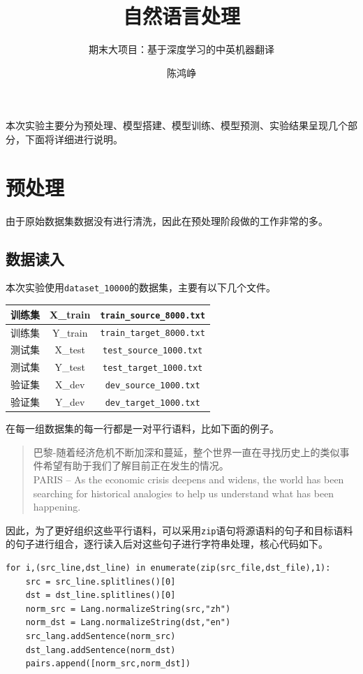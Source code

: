 \documentclass[logo,reportComp]{thesis}
\title{自然语言处理}
\subtitle{期末大项目：基于深度学习的中英机器翻译}
\author{陈鸿峥}
\begin{document}
\maketitle
\tableofcontents

\newpage

本次实验主要分为预处理、模型搭建、模型训练、模型预测、实验结果呈现几个部分，下面将详细进行说明。

\section{预处理}
由于原始数据集数据没有进行清洗，因此在预处理阶段做的工作非常的多。

\subsection{数据读入}
本次实验使用\verb'dataset_10000'的数据集，主要有以下几个文件。
\begin{table}[H]
\centering
\begin{tabular}{|c|c|c|}\hline
训练集 & X\_train & \verb'train_source_8000.txt'\\\hline
训练集 & Y\_train & \verb'train_target_8000.txt'\\\hline
测试集 & X\_test & \verb'test_source_1000.txt'\\\hline
测试集 & Y\_test & \verb'test_target_1000.txt'\\\hline
验证集 & X\_dev & \verb'dev_source_1000.txt'\\\hline
验证集 & Y\_dev & \verb'dev_target_1000.txt'\\\hline
\end{tabular}
\end{table}

在每一组数据集的每一行都是一对平行语料，比如下面的例子。
\begin{quote}
巴黎-随着经济危机不断加深和蔓延，整个世界一直在寻找历史上的类似事件希望有助于我们了解目前正在发生的情况。\\
PARIS -- As the economic crisis deepens and widens, the world has been searching for historical analogies to help us understand what has been happening.
\end{quote}

因此，为了更好组织这些平行语料，可以采用\verb'zip'语句将源语料的句子和目标语料的句子进行组合，逐行读入后对这些句子进行字符串处理，核心代码如下。
\begin{lstlisting}
for i,(src_line,dst_line) in enumerate(zip(src_file,dst_file),1):
    src = src_line.splitlines()[0]
    dst = dst_line.splitlines()[0]
    norm_src = Lang.normalizeString(src,"zh")
    norm_dst = Lang.normalizeString(dst,"en")
    src_lang.addSentence(norm_src)
    dst_lang.addSentence(norm_dst)
    pairs.append([norm_src,norm_dst])
\end{lstlisting}
\end{document}
